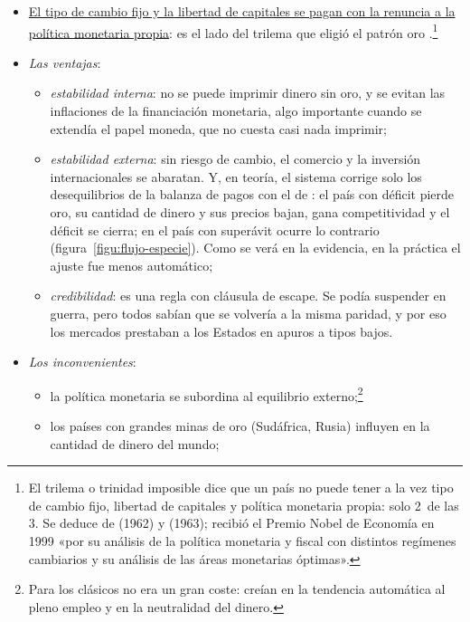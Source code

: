 \documentclass[11pt]{article}
\begin{document}
\begin{itemize}
\item \uline{El tipo de cambio fijo y la libertad de capitales se pagan con la renuncia a la política monetaria propia}: es el lado del trilema que eligió el patrón oro\nocite{ObstfeldShambaughTaylor2005} .\footnote{El trilema o trinidad imposible dice que un país no puede tener a la vez tipo de cambio fijo, libertad de capitales y política monetaria propia: solo 2~de las 3. Se deduce de  (1962) y  (1963)\nocite{Fleming1962Domestic,Mundell1963Capital};  recibió el Premio Nobel de Economía en 1999 «por su análisis de la política monetaria y fiscal con distintos regímenes cambiarios y su análisis de las áreas monetarias óptimas»\nocite{Nobel1999Mundell}.}
\item \emph{Las ventajas}:
  \begin{itemize}
  \item \emph{estabilidad interna}: no se puede imprimir dinero sin oro, y se evitan las inflaciones de la financiación monetaria, algo importante cuando se extendía el papel moneda, que no cuesta casi nada imprimir;
  \item \emph{estabilidad externa}: sin riesgo de cambio, el comercio y la inversión internacionales se abaratan. Y, en teoría, el sistema corrige solo los desequilibrios de la balanza de pagos con el  de : el país con déficit pierde oro, su cantidad de dinero y sus precios bajan, gana competitividad y el déficit se cierra; en el país con superávit ocurre lo contrario (figura~\ref{figu:flujo-especie}). Como se verá en la evidencia, en la práctica el ajuste fue menos automático;
  \item \emph{credibilidad}: es una regla con cláusula de escape. Se podía suspender en guerra, pero todos sabían que se volvería a la misma paridad, y por eso los mercados prestaban a los Estados en apuros a tipos bajos\nocite{BordoKydland1995}.
  \end{itemize}
\item \emph{Los inconvenientes}:
  \begin{itemize}
  \item la política monetaria se subordina al equilibrio externo;\footnote{Para los clásicos no era un gran coste: creían en la tendencia automática al pleno empleo y en la neutralidad del dinero.}
  \item los países con grandes minas de oro (Sudáfrica, Rusia) influyen en la cantidad de dinero del mundo;

\end{itemize}
\end{itemize}
\end{document}
